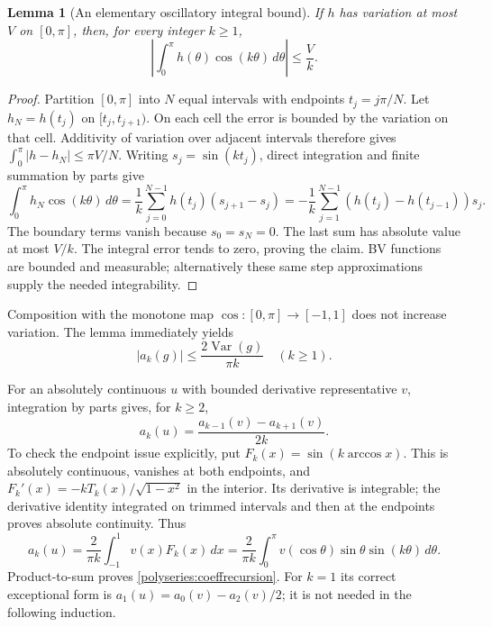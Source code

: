 \documentclass[11pt]{article}
\newtheorem{lemma}[theorem]{Lemma}
\theoremstyle{remark}
\numberwithin{equation}{section}
\begin{document}
\begin{lemma}[An elementary oscillatory integral bound]
\label{polyseries:bvbase}
If $h$ has variation at most $V$ on $[0,\pi]$, then, for every integer $k\ge1$,
\[
 \left|\int_0^\pi h(\theta)\cos(k\theta)\,d\theta\right|\le\frac Vk.
\]
\end{lemma}
\begin{proof}
Partition $[0,\pi]$ into $N$ equal intervals with endpoints $t_j=j\pi/N$.
Let $h_N=h(t_j)$ on $[t_j,t_{j+1})$. On each cell the error is bounded
by the variation on that cell. Additivity of variation over adjacent
intervals therefore gives
$\int_0^\pi|h-h_N|\le\pi V/N$.
Writing $s_j=\sin(kt_j)$, direct integration and finite summation by parts give
\[
 \int_0^\pi h_N\cos(k\theta)\,d\theta
  =\frac1k\sum_{j=0}^{N-1}h(t_j)(s_{j+1}-s_j)
  =-\frac1k\sum_{j=1}^{N-1}(h(t_j)-h(t_{j-1}))s_j.
\]
The boundary terms vanish because $s_0=s_N=0$. The last sum has absolute
value at most $V/k$. The integral error tends to zero, proving the claim.
BV functions are bounded and measurable; alternatively these same step
approximations supply the needed integrability.
\end{proof}
Composition with the monotone map $\cos:[0,\pi]\to[-1,1]$ does not
increase variation. The lemma immediately yields
\begin{equation}\label{polyseries:bvzero}
 |a_k(g)|\le\frac{2\operatorname{Var}(g)}{\pi k}\quad(k\ge1).
\end{equation}

For an absolutely continuous $u$ with bounded derivative representative
$v$, integration by parts gives, for $k\ge2$,
\begin{equation}\label{polyseries:coeffrecursion}
 a_k(u)=\frac{a_{k-1}(v)-a_{k+1}(v)}{2k}.
\end{equation}
To check the endpoint issue explicitly, put
$F_k(x)=\sin(k\arccos x)$. This is absolutely continuous, vanishes at
both endpoints, and
$F_k'(x)=-kT_k(x)/\sqrt{1-x^2}$ in the interior. Its derivative is
integrable; the derivative identity integrated on trimmed intervals and
then at the endpoints proves absolute continuity. Thus
\[
 a_k(u)=\frac2{\pi k}\int_{-1}^1v(x)F_k(x)\,dx
 =\frac2{\pi k}\int_0^\pi
 v(\cos\theta)\sin\theta\sin(k\theta)\,d\theta.
\]
Product-to-sum proves \eqref{polyseries:coeffrecursion}. For $k=1$ its
correct exceptional form is $a_1(u)=a_0(v)-a_2(v)/2$; it is not needed
in the following induction.
\end{document}
